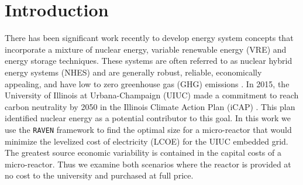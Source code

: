\section{Introduction}

There has been significant work recently to develop energy system concepts that incorporate a mixture of nuclear energy, variable renewable energy (VRE) and energy storage techniques. These systems are often referred to as nuclear hybrid energy systems (NHES) and are generally robust, reliable, economically appealing, and have low to zero greenhouse gas (GHG) emissions \cite{baker_optimal_2018,ruth_nuclear-renewable_2014,ruth_economic_2016,suman_hybrid_2018-1}. In 2015, the University of Illinois at Urbana-Champaign (UIUC) made a commitment to reach carbon neutrality by 2050 in the Illinois Climate Action Plan (iCAP) \cite{isee_illinois_2015}. This plan identified nuclear energy as a potential contributor to this goal. In this work we use the \texttt{RAVEN} framework to find the optimal size for a micro-reactor that would minimize the levelized cost of electricity (LCOE) for the UIUC embedded grid. The greatest source economic variability is contained in the capital costs of a micro-reactor. Thus we examine both scenarios where the reactor is provided at no cost to the university and purchased at full price.